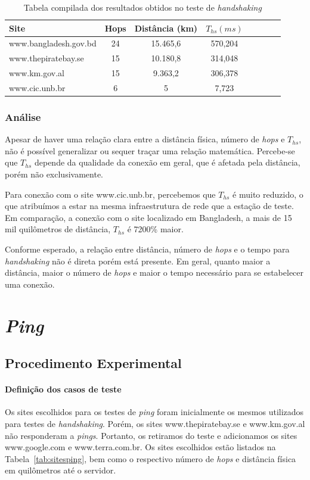 \documentclass[12pt,a4paper]{report}
\begin{document}
\begin{table}[h]
	\center
	\begin{tabular}{l*{6}{c}r}
	Site						& Hops	& Distância (km)	& \(T_{hs} (ms)\)\\
	\hline
	www.bangladesh.gov.bd		& 24		& 15.465,6		& 570,204\\
	www.thepiratebay.se		& 15		& 10.180,8		& 314,048\\
	www.km.gov.al				& 15		& 9.363,2			& 306,378\\
	www.cic.unb.br				& 6		& 5				& 7,723\\
	\end{tabular}
	\caption{Tabela compilada dos resultados obtidos no teste de \textit{handshaking}}
	\label{tab:resultshandshaking}
\end{table}

\subsubsection*{Análise}

Apesar de haver uma relação clara entre a distância física, número de \textit{hops} e \(T_{hs}\), não é possível generalizar ou sequer traçar uma relação matemática. Percebe-se que \(T_{hs}\) depende da qualidade da conexão em geral, que é afetada pela distância, porém não exclusivamente.

Para conexão com o site www.cic.unb.br, percebemos que \(T_{hs}\) é muito reduzido, o que atribuímos a estar na mesma infraestrutura de rede que a estação de teste. Em comparação, a conexão com o site localizado em Bangladesh, a mais de 15 mil quilômetros de distância, \(T_{hs}\) é 7200\% maior.

Conforme esperado, a relação entre distância, número de \textit{hops} e o tempo para \textit{handshaking} não é direta porém está presente. Em geral, quanto maior a distância, maior o número de \textit{hops} e maior o tempo necessário para se estabelecer uma conexão.

\section{\textit{Ping}}

\subsection{Procedimento Experimental}

\paragraph{Definição dos casos de teste} Os sites escolhidos para os testes de \textit{ping} foram inicialmente os mesmos utilizados para testes de \textit{handshaking}. Porém, os sites www.thepiratebay.se e www.km.gov.al não responderam a \textit{pings}. Portanto, os retiramos do teste e adicionamos os sites www.google.com e www.terra.com.br. Os sites escolhidos estão listados na Tabela~\ref{tab:sitesping}, bem como o respectivo número de \textit{hops} e distância física em quilômetros até o servidor.
\end{document}
